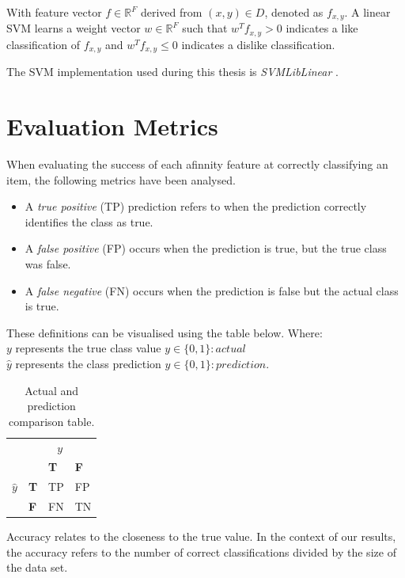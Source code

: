With feature vector $f \in \mathbb{R}^F$ derived from $(x,y) \in D$, denoted as $f_{x,y}$. A linear SVM learns a weight vector $w \in \mathbb{R}^F$
such that $w^T f_{x,y} > 0$ indicates a like classification of $f_{x,y}$ and $w^T f_{x,y} \leq 0$ indicates a dislike classification.

The SVM implementation used during this thesis is \emph{SVMLibLinear} \cite{cjlin}.

\section{Evaluation Metrics}
\label{sec:notation}

When evaluating the success of each afinnity feature at correctly classifying an item, the following metrics have been analysed.

\begin{itemize}
\item A \emph{true positive} (TP) prediction refers to when the prediction correctly identifies the class as true. 
\item A \emph{false positive} (FP) occurs when the prediction is true, but the true class was false.
\item A \emph{false negative} (FN) occurs when the prediction is false but the actual class is true.
\end{itemize}

These definitions can be visualised using the table below. Where:
\\
$y$ represents the true class value $y \in \{0,1\} : actual$
\\
$\hat{y}$ represents the class prediction $\hat{y} \in \{0,1\} : prediction$.

\begin{table}[tbh!]
\centering
\begin{tabular}{r|l|l|l|}
\multicolumn{1}{r}{}
 &  \multicolumn{3}{c}{$y$} \\
 \cline{2-4}
& & \textbf{T} & \textbf{F} \\ 
\cline{2-4}
$\hat{y}$ & \textbf{T} & TP & FP \\
\cline{2-4}
& \textbf{F} & FN & TN \\
\cline{2-4}
\end{tabular}
\caption{Actual and prediction comparison table.}
	\label{tab:revpol}
\end{table}

Accuracy relates to the closeness to the true value. In the context of our results, the accuracy refers to the number of correct classifications 
divided by the size of the data set.

